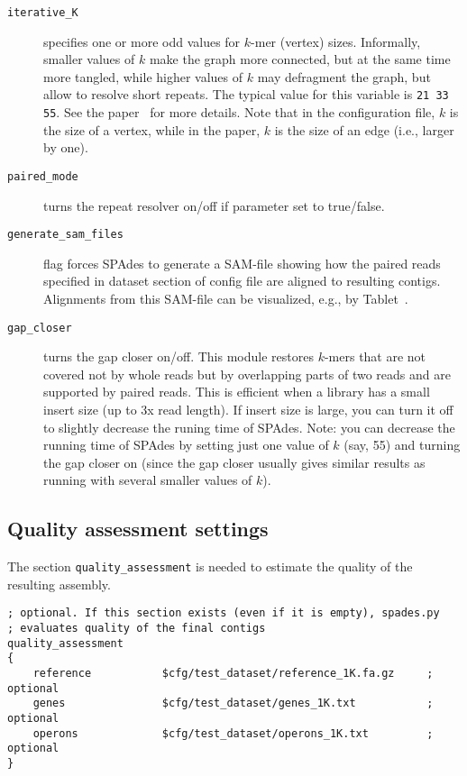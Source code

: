 \documentclass{article}
\def\spades{SPAdes}
\begin{document}
\begin{description}
\item[{\tt iterative\_K}] specifies one or more odd values for $k$-mer (vertex) sizes.  Informally, smaller values of $k$ make the graph more connected,
but at the same time more tangled, while higher values of $k$ may defragment the graph, but allow to resolve short repeats.
The typical value for this variable is {\tt 21 33 55}. See the paper~\cite{main} for more details.
Note that in the configuration file, $k$ is the size of a vertex, while in the paper, $k$ is the size of an edge (i.e., larger by one).

\item[{\tt paired\_mode}] turns the repeat resolver on/off if parameter set to true/false.

\item[{\tt generate\_sam\_files}] flag forces {\spades} to generate a SAM-file
showing how the paired reads specified in dataset section of config file are aligned to resulting contigs.  Alignments from this SAM-file
can be visualized, e.g., by Tablet~\cite{tablet}.

\item[{\tt gap\_closer}] turns the gap closer on/off. This module restores $k$-mers that are not covered not by whole reads
but by overlapping parts of two reads and are supported by paired reads. This is efficient when a library has a small insert size (up to 3x read length). If insert size is large, you can turn 
it off to slightly decrease the runing time of {\spades}.
Note: you can decrease the running time of {\spades} by setting just one value of $k$ (say, 55) and turning the gap closer on
(since the gap closer usually gives similar results as running with several smaller values of $k$).
\end{description}

\subsection{Quality assessment settings}\label{subsection:qualitysetting}
The section {\tt quality\_assessment}
is needed to estimate the quality of the resulting assembly.

\begin{lstlisting}
; optional. If this section exists (even if it is empty), spades.py 
; evaluates quality of the final contigs
quality_assessment      
{
    reference           $cfg/test_dataset/reference_1K.fa.gz     ; optional
    genes               $cfg/test_dataset/genes_1K.txt           ; optional
    operons             $cfg/test_dataset/operons_1K.txt         ; optional
}
\end{lstlisting}
\end{document}
